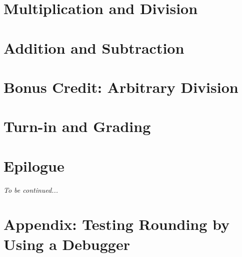 \documentclass[12pt]{article}
\begin{document}
    \section{Multiplication and Division}                               

    \section{Addition and Subtraction} \label{sec:addition}             

    \section{Bonus Credit: Arbitrary Division} \label{sec:bonus}        

    \section{Turn-in and Grading}                                       

    \section*{Epilogue}         \scenariowrapup


    \textit{To be continued...}

    \newpage\appendix

    \section{Appendix: Testing Rounding by Using a Debugger} \label{sec:testRounding}
                                                                        
\end{document}
